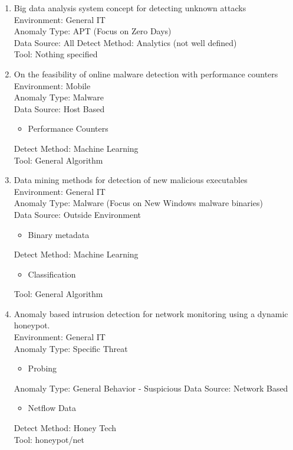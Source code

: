 \begin{enumerate}
    \item 
    Big data analysis system concept for detecting unknown attacks\cite{ahn2014big}\\
    Environment: General IT \\
    Anomaly Type: APT (Focus on Zero Days) \\
    Data Source: All
    Detect Method: Analytics (not well defined)\\ 
    Tool: Nothing specified
    
    \item 
    On the feasibility of online malware detection with performance counters\cite{demme2013feasibility}\\
    Environment: Mobile\\
    Anomaly Type: Malware \\
    Data Source: Host Based
    \begin{itemize}
        \item Performance Counters
    \end{itemize}
    Detect Method: Machine Learning\\ 
    Tool: General Algorithm
    
    \item 
    Data mining methods for detection of new malicious executables\cite{schultz2001data}\\
    Environment: General IT\\
    Anomaly Type: Malware (Focus on New Windows malware binaries)\\
    Data Source: Outside Environment
    \begin{itemize}
        \item Binary metadata
    \end{itemize}
    Detect Method: Machine Learning
    \begin{itemize}
        \item Classification
    \end{itemize}
    Tool: General Algorithm
    
    \item 
    Anomaly based intrusion detection for network monitoring using a dynamic honeypot.\cite{hieb2004anomaly}\\
    Environment: General IT\\
    Anomaly Type: Specific Threat
    \begin{itemize}
        \item Probing
    \end{itemize}
    Anomaly Type: General Behavior - Suspicious
    Data Source: Network Based
    \begin{itemize}
        \item Netflow Data
    \end{itemize}
    Detect Method: Honey Tech\\ 
    Tool: honeypot/net 
    

\end{enumerate}
